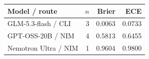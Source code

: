 \begin{tabular}{lrrr}
\toprule
Model / route & $n$ & Brier & ECE \\
\midrule
GLM-5.3-flash / CLI & 3 & 0.0063 & 0.0733 \\
GPT-OSS-20B / NIM & 4 & 0.5813 & 0.6455 \\
Nemotron Ultra / NIM & 1 & 0.9604 & 0.9800 \\
\bottomrule
\end{tabular}
